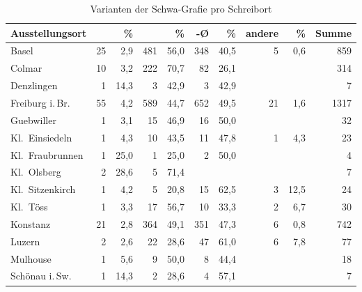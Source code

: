 \begin{table}
\caption{Varianten der Schwa-Grafie pro Schreibort}
\begin{tabular}{
	l @{\qquad}
	r r @{\qquad}
	r r @{\qquad}
	r r @{\qquad}
	r r @{\qquad}
	r}

\lsptoprule

Ausstellungsort
	& \norm{-i} & \%
	& \norm{-e} & \%
	& -Ø & \%
	& andere & \%
	& Summe
	\\

\midrule

Basel
	& 25	& 2,9
	& 481	& 56,0
	& 348	& 40,5
	& 5		& 0,6
	& 859
	\\

Colmar
	& 10	& 3,2
	& 222	& 70,7
	& 82	& 26,1
	& 		&
	& 314
	\\

Denzlingen
	& 1 & 14,3
	& 3	& 42,9
	& 3	& 42,9
	& 	&
	& 7
	\\

Freiburg i.\,Br.
	& 55	& 4,2
	& 589	& 44,7
	& 652	& 49,5
	& 21	& 1,6
	& 1317
	\\

Guebwiller
	& 1		& 3,1
	& 15	& 46,9
	& 16	& 50,0
	& 		&
	& 32
	\\

Kl.~Einsiedeln
	& 1		& 4,3
	& 10	& 43,5
	& 11	& 47,8
	& 1		& 4,3
	& 23
	\\

Kl.~Fraubrunnen
	& 1	& 25,0
	& 1	& 25,0
	& 2	& 50,0
	&	&
	& 4
	\\

Kl.~Olsberg
	& 2	& 28,6
	& 5	& 71,4
	&	&
	&	&
	& 7
	\\

Kl.~Sitzenkirch
	& 1		& 4,2
	& 5		& 20,8
	& 15	& 62,5
	& 3		& 12,5
	& 24
	\\

Kl.~Töss
	& 1		& 3,3
	& 17	& 56,7
	& 10	& 33,3
	& 2		& 6,7
	& 30
	\\

Konstanz
	& 21 	& 2,8
	& 364	& 49,1
	& 351	& 47,3
	& 6		& 0,8
	& 742
	\\

Luzern
	& 2		& 2,6
	& 22	& 28,6
	& 47	& 61,0
	& 6		& 7,8
	& 77
	\\

Mulhouse
	& 1	& 5,6
	& 9	& 50,0
	& 8	& 44,4
	&	&
	& 18
	\\

Schönau i.\,Sw.
	& 1	& 14,3
	& 2	& 28,6
	& 4	& 57,1
	&	&
	& 7
	\\


\end{tabular}
\end{table}
